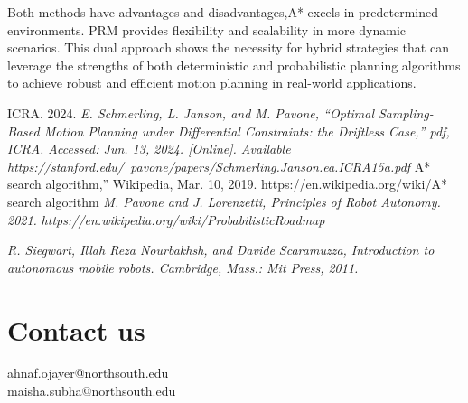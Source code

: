 \documentclass[9pt,a4paper,twoside]{rho-class/rho}
\begin{document}
Both methods have advantages and disadvantages,A* excels in predetermined environments. PRM provides flexibility and scalability in more dynamic scenarios. This dual approach shows the necessity for hybrid strategies that can leverage the strengths of both deterministic and probabilistic planning algorithms to achieve robust and efficient motion planning in real-world applications.

\begin{thebibliography}{}
    ICRA. 2024. \textit{E. Schmerling, L. Janson, and M. Pavone, “Optimal Sampling-Based Motion Planning under Differential Constraints: the Driftless Case,” pdf, ICRA. Accessed: Jun. 13, 2024. [Online]. Available }%
\textit{https://stanford.edu/~pavone/papers/Schmerling.Janson.ea.ICRA15a.pdf}
    A* search algorithm,” Wikipedia, Mar. 10, 2019. https://en.wikipedia.org/wiki/A* search algorithm
    \textit{M. Pavone and J. Lorenzetti, Principles of Robot Autonomy. 2021.}
   \textit{https://en.wikipedia.org/wiki/ProbabilisticRoadmap}
  
  \textit{R. Siegwart, Illah Reza Nourbakhsh, and Davide Scaramuzza, Introduction to autonomous mobile robots. Cambridge, Mass.: Mit Press, 2011.}
\end{thebibliography}



    \section{Contact us}
        \begin{info}
            \faEnvelope[regular]\hspace{7pt}ahnaf.ojayer@northsouth.edu \\
    \faEnvelope[regular]\hspace{7pt}maisha.subha@northsouth.edu \\
        \end{info}
        

\printbibliography

\end{document}
